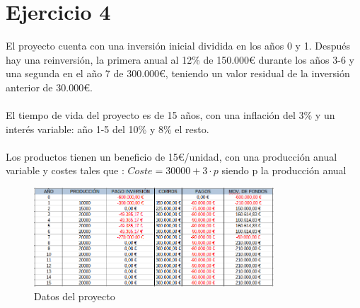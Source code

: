 \documentclass[11pt,letterpaper,onecolumn]{article}
\begin{document}
\section{Ejercicio 4}
El proyecto cuenta con una inversión inicial dividida en los años 0 y 1. Después hay una reinversión, la primera anual al 12\% de 150.000€ durante los años 3-6 y una segunda en el año 7 de 300.000€, teniendo un valor residual de la inversión anterior de 30.000€.\\
\\
El tiempo de vida del proyecto es de 15 años, con una inflación del 3\% y un interés variable: año 1-5 del 10\% y 8\% el resto. \\
\\
Los productos tienen un beneficio de 15€/unidad, con una producción anual variable y costes tales que : $Coste=30000+3\cdot p$ siendo p la producción anual
\begin{figure}[H]
	\centering
	\includegraphics[width=0.8\textwidth]{imagen/ej4a.png}
	\caption{Datos del proyecto}
	\label{fig:ej4a-png}
\end{figure}
\end{document}
